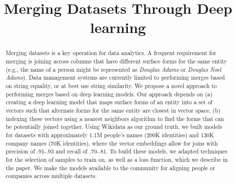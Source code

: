 \documentclass[letterpaper]{article} %
\begin{document}
%
\title{Merging Datasets Through Deep learning}




\maketitle
\begin{abstract}
Merging datasets is a key operation for data analytics.  A frequent requirement for merging is joining across columns that have different surface forms for the same entity (e.g., the name of a person might be represented as \textit{Douglas Adams} or \textit{Douglas Noel Adams}).  Data management systems are currently limited to performing merges based on string equality, or at best use string similarity.  We propose a novel approach to performing merges based on deep learning models.  Our approach depends on (a) creating a deep learning model that maps surface forms of an entity into a set of vectors such that alternate forms for the same entity are closest in vector space, (b) indexing these vectors using a nearest neighbors algorithm to find the forms that can be potentially joined together.  Using Wikidata as our ground truth, we built models for datasets with approximately 1.1M people's names (200K identities) and 130K company names (70K identities), where the vector embeddings allow for joins with precision of .91-.93 and recall of .70-.81. To build these models, we adapted techniques for the selection of samples to train on, as well as a loss function, which we describe in the paper.  We make the models available to the community for aligning people or companies across multiple datasets.
  
\end{abstract}








  
  
  
\end{document}
